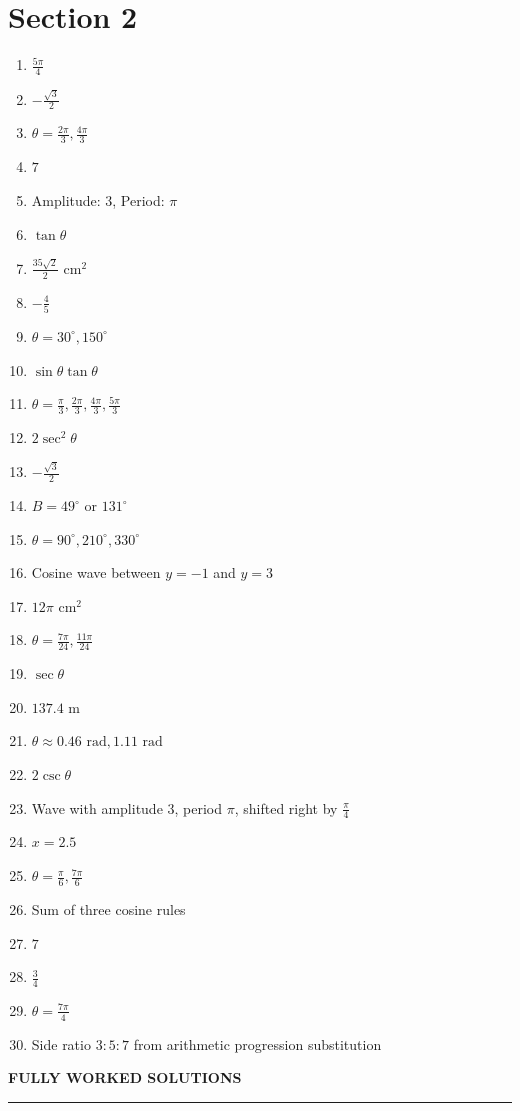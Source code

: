 \documentclass{article}
\begin{document}
\section*{Section 2}
\begin{enumerate}
    
    \item $\frac{5\pi}{4}$
    \item $-\frac{\sqrt{3}}{2}$
    \item $\theta = \frac{2\pi}{3}, \frac{4\pi}{3}$
    \item $7$
    \item Amplitude: $3$, Period: $\pi$
    \item $\tan \theta$
    \item $\frac{35\sqrt{2}}{2} \text{ cm}^2$
    \item $-\frac{4}{5}$
    \item $\theta = 30^\circ, 150^\circ$
    \item $\sin\theta\tan\theta$
    \item $\theta = \frac{\pi}{3}, \frac{2\pi}{3}, \frac{4\pi}{3}, \frac{5\pi}{3}$
    \item $2\sec^2 \theta$
    \item $-\frac{\sqrt{3}}{2}$
    \item $B = 49^\circ$ or $131^\circ$
    \item $\theta = 90^\circ, 210^\circ, 330^\circ$
    \item Cosine wave between $y=-1$ and $y=3$
    \item $12\pi \text{ cm}^2$
    \item $\theta = \frac{7\pi}{24}, \frac{11\pi}{24}$
    \item $\sec \theta$
    \item $137.4 \text{ m}$
    \item $\theta \approx 0.46 \text{ rad}, 1.11 \text{ rad}$
    \item $2\csc \theta$
    \item Wave with amplitude $3$, period $\pi$, shifted right by $\frac{\pi}{4}$
    \item $x = 2.5$
    \item $\theta = \frac{\pi}{6}, \frac{7\pi}{6}$
    \item Sum of three cosine rules
    \item $7$
    \item $\frac{3}{4}$
    \item $\theta = \frac{7\pi}{4}$
    \item Side ratio $3:5:7$ from arithmetic progression substitution
\end{enumerate}
\newpage
\begin{center}\Large \textbf{FULLY WORKED SOLUTIONS}\end{center}\vspace{0.2cm}\hrule\vspace{0.5cm}
\end{document}
